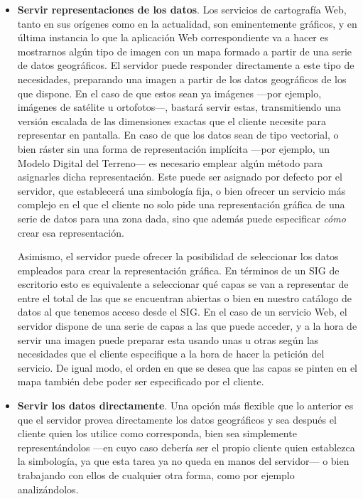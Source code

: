 \begin{itemize}
\item \textbf{Servir representaciones de los datos}. Los servicios de cartografía Web, tanto en sus orígenes como en la actualidad, son eminentemente gráficos, y en última instancia lo que la aplicación Web correspondiente va a hacer es mostrarnos algún tipo de imagen con un mapa formado a partir de una serie de datos geográficos. El servidor puede responder directamente a este tipo de necesidades, preparando una imagen a partir de los datos geográficos de los que dispone. En el caso de que estos sean ya imágenes ---por ejemplo, imágenes de satélite u ortofotos---, bastará servir estas, transmitiendo una versión escalada de las dimensiones exactas que el cliente necesite para representar en pantalla. En caso de que los datos sean de tipo vectorial, o bien ráster sin una forma de representación implícita ---por ejemplo, un Modelo Digital del Terreno--- es necesario emplear algún método para asignarles dicha representación. Este puede ser asignado por defecto por el servidor, que establecerá una simbología fija, o bien ofrecer un servicio más complejo en el que el cliente no solo pide una representación gráfica de una serie de datos para una zona dada, sino que además puede especificar \emph{cómo} crear esa representación.

Asimismo, el servidor puede ofrecer la posibilidad de seleccionar los datos empleados para crear la representación gráfica. En términos de un SIG de escritorio esto es equivalente a seleccionar qué capas se van a representar de entre el total de las que se encuentran abiertas o bien en nuestro catálogo de datos al que tenemos acceso desde el SIG. En el caso de un servicio Web, el servidor dispone de una serie de capas a las que puede acceder, y a la hora de servir una imagen puede preparar esta usando unas u otras según las necesidades que el cliente especifique a la hora de hacer la petición del servicio. De igual modo, el orden en que se desea que las capas se pinten en el mapa también debe poder ser especificado por el cliente.

\item \textbf{Servir los datos directamente}. Una opción más flexible que lo anterior es que el servidor provea directamente los datos geográficos y sea después el cliente quien los utilice como corresponda, bien sea simplemente representándolos ---en cuyo caso debería ser el propio cliente quien establezca la simbología, ya que esta tarea ya no queda en manos del servidor--- o bien trabajando con ellos de cualquier otra forma, como por ejemplo analizándolos. 


\end{itemize}
